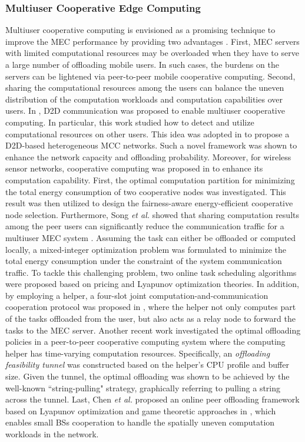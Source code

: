 \documentclass[journal]{IEEEtran}
\begin{document}
\subsubsection{\textbf{Multiuser Cooperative Edge Computing}}
Multiuser cooperative computing is envisioned as a promising technique to improve the MEC performance by providing  two advantages \cite{li2014exploring,jo2015device,sheng:2016:energy,song2014energy,XCao1704,You:2017aa,LChen1703}. First, MEC servers with limited computational resources may  be overloaded when they have to serve  a large number of offloading mobile users. In such cases, the  burdens on the servers  can be lightened via peer-to-peer mobile  cooperative computing. Second, sharing the computational resources among the users can balance the uneven distribution  of the  computation workloads and computation capabilities over  users.
In \cite{li2014exploring}, D2D communication was proposed to enable multiuser cooperative computing. In particular, this work studied  how to detect and utilize computational resources on other users. This idea was  adopted in \cite{jo2015device} to propose a D2D-based heterogeneous MCC networks. Such a novel framework was shown to enhance the  network capacity and offloading probability. Moreover, for wireless sensor networks, cooperative computing was proposed in \cite{sheng:2016:energy} to enhance its computation capability.  First, the optimal computation partition for minimizing the total energy consumption of two cooperative nodes was investigated. This result was then utilized to design the fairness-aware energy-efficient cooperative node selection. Furthermore, Song \emph{et al.} showed that sharing computation results among the peer users can significantly reduce the communication traffic for a multiuser MEC system \cite{song2014energy}. Assuming the task can either be offloaded or computed locally, a mixed-integer optimization problem was formulated to minimize the total energy consumption under the constraint of the system communication traffic. To tackle this challenging problem, two online task scheduling algorithms were proposed based on pricing and Lyapunov optimization theories.  In addition, by employing a helper, a four-slot joint computation-and-communication cooperation protocol was proposed in \cite{XCao1704}, where the helper not only computes part of the tasks offloaded from the user, but also acts as a relay node to forward the tasks to the MEC server. Another recent work \cite{You:2017aa} investigated the optimal offloading policies in a peer-to-peer cooperative computing system where the computing helper has time-varying computation resources. Specifically, an \emph{offloading feasibility tunnel} was constructed based on the helper's CPU profile and buffer size. Given the tunnel, the optimal offloading was shown to be achieved by the well-known ``string-pulling" strategy, graphically referring to pulling a string across the tunnel. Last, Chen \emph{et al.} proposed an online peer offloading framework based on Lyapunov optimization and game theoretic approaches in \cite{LChen1703}, which enables small BSs cooperation to handle the spatially uneven computation workloads in the network. 
\end{document}
